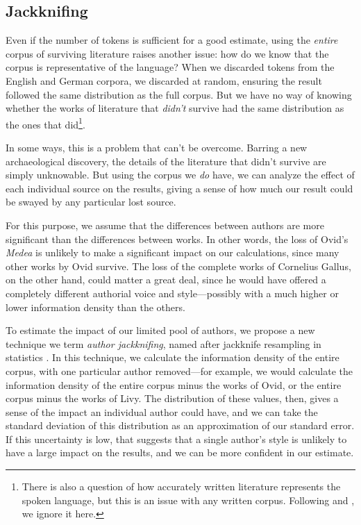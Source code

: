 \documentclass[12pt,twoside]{article}
\begin{document}
\subsection{Jackknifing}

Even if the number of tokens is sufficient for a good estimate, using the \emph{entire} corpus of surviving literature raises another issue: how do we know that the corpus is representative of the language? When we discarded tokens from the English and German corpora, we discarded at random, ensuring the result followed the same distribution as the full corpus. But we have no way of knowing whether the works of literature that \emph{didn't} survive had the same distribution as the ones that did\footnote{There is also a question of how accurately written literature represents the spoken language, but this is an issue with any written corpus. Following \citet{oh} and \citet{coupé}, we ignore it here.}.

In some ways, this is a problem that can't be overcome. Barring a new archaeological discovery, the details of the literature that didn't survive are simply unknowable. But using the corpus we \emph{do} have, we can analyze the effect of each individual source on the results, giving a sense of how much our result could be swayed by any particular lost source.

For this purpose, we assume that the differences between authors are more significant than the differences between works. In other words, the loss of Ovid's \emph{Medea} is unlikely to make a significant impact on our calculations, since many other works by Ovid survive. The loss of the complete works of Cornelius Gallus, on the other hand, could matter a great deal, since he would have offered a completely different authorial voice and style---possibly with a much higher or lower information density than the others.

To estimate the impact of our limited pool of authors, we propose a new technique we term \emph{author jackknifing}, named after jackknife resampling in statistics \citep{efron}. In this technique, we calculate the information density of the entire corpus, with one particular author removed---for example, we would calculate the information density of the entire corpus minus the works of Ovid, or the entire corpus minus the works of Livy. The distribution of these values, then, gives a sense of the impact an individual author could have, and we can take the standard deviation of this distribution as an approximation of our standard error. If this uncertainty is low, that suggests that a single author's style is unlikely to have a large impact on the results, and we can be more confident in our estimate.
\end{document}
